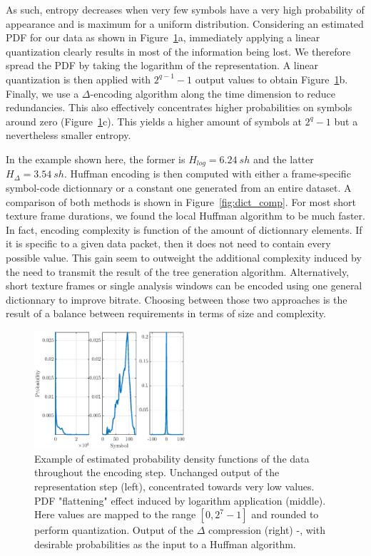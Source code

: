 \documentclass[final,3p,times,twocolumn]{elsarticle}
\begin{document}
As such, entropy decreases when very few symbols have a very high probability of appearance and is maximum for a uniform distribution. Considering an estimated PDF for our data as shown in Figure~\ref{fig:pdf}a, immediately applying a linear quantization clearly results in most of the information being lost. We therefore spread the PDF by taking the logarithm of the representation. A linear quantization is then applied with $2^{q-1}-1$ output values to obtain Figure~\ref{fig:pdf}b. Finally, we use a $\Delta$-encoding algorithm along the time dimension to reduce redundancies. This also effectively concentrates higher probabilities on symbols around zero (Figure~\ref{fig:pdf}c). This yields a higher amount of symbols at $2^q-1$ but a nevertheless smaller entropy.

In the example shown here, the former is $H_{log} = 6.24~sh$ and the latter $H_{\Delta} = 3.54~sh$. Huffman encoding is then computed with either a frame-specific symbol-code dictionnary or a constant one generated from an entire dataset. A comparison of both methods is shown in Figure~\ref{fig:dict_comp}. For most short texture frame durations, we found the local Huffman algorithm to be much faster. In fact, encoding complexity is function of the amount of dictionnary elements. If it is specific to a given data packet, then it does not need to contain every possible value. This gain seem to outweight the additional complexity induced by the need to transmit the result of the tree generation algorithm. Alternatively, short texture frames or single analysis windows can be encoded using one general dictionnary to improve bitrate. Choosing between those two approaches is the result of a balance between requirements in terms of size and complexity.\\

\begin{figure}[htbp]
	\centering
		\includegraphics[width=0.5\textwidth]{figures/pdf.eps}
	\caption{Example of estimated probability density functions of the data throughout the encoding step. Unchanged output of the representation step (left), concentrated towards very low values. PDF "flattening" effect induced by logarithm application (middle). Here values are mapped to the range $[0, 2^7-1]$ and rounded to perform quantization. Output of the $\Delta$ compression (right) -, with desirable probabilities as the input to a Huffman algorithm.}
	\label{fig:pdf}
\end{figure}
\end{document}
